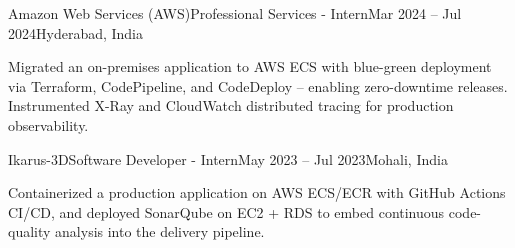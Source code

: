 \resumeExp
{Amazon Web Services (AWS)}{Professional Services - Intern}{Mar 2024 -- Jul 2024}{Hyderabad, India}
\resumeItemListStart
    \item[$\diamond$] Migrated an on-premises application to AWS ECS with blue-green deployment via Terraform, CodePipeline, and CodeDeploy -- enabling zero-downtime releases. Instrumented X-Ray and CloudWatch distributed tracing for production observability.
\resumeItemListEnd

\resumeExp
{Ikarus-3D}{Software Developer - Intern}{May 2023 -- Jul 2023}{Mohali, India}
\resumeItemListStart
    \item[$\diamond$] Containerized a production application on AWS ECS/ECR with GitHub Actions CI/CD, and deployed SonarQube on EC2 + RDS to embed continuous code-quality analysis into the delivery pipeline.
\resumeItemListEnd

\resumeSubHeadingListEnd

